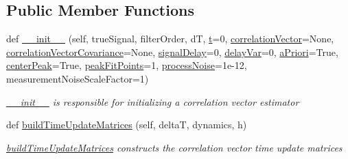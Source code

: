 \subsection*{Public Member Functions}
\begin{DoxyCompactItemize}
\item 
def \hyperlink{classSignalCorrelationSubstate_1_1CorrelationFilter_a98d7aaf451122a2bc10fdcffafcf1768}{\+\_\+\+\_\+init\+\_\+\+\_\+} (self, true\+Signal, filter\+Order, dT, \hyperlink{classSignalCorrelationSubstate_1_1CorrelationFilter_a7931bebb63d9482b44f69d31786c4086}{t}=0, \hyperlink{classSignalCorrelationSubstate_1_1CorrelationFilter_ae308a025a3a7ebdf4e66b5fd3fdf2b7d}{correlation\+Vector}=None, \hyperlink{classSignalCorrelationSubstate_1_1CorrelationFilter_a484e6bdabe405d0aba1dcf4d5729dd72}{correlation\+Vector\+Covariance}=None, \hyperlink{classSignalCorrelationSubstate_1_1CorrelationFilter_a01e35890dee1d79bd0e4f9e82cb16e3f}{signal\+Delay}=0, \hyperlink{classSignalCorrelationSubstate_1_1CorrelationFilter_a34d52beb18c131f2305689d48f612a5a}{delay\+Var}=0, \hyperlink{classSignalCorrelationSubstate_1_1CorrelationFilter_a960e7455c5def570629d69a2bf1cb288}{a\+Priori}=True, \hyperlink{classSignalCorrelationSubstate_1_1CorrelationFilter_a8e53182c2ff431a6a545a265cda6ba48}{center\+Peak}=True, \hyperlink{classSignalCorrelationSubstate_1_1CorrelationFilter_a85a73739e9bb0a7f20886a812a3afa83}{peak\+Fit\+Points}=1, \hyperlink{classSignalCorrelationSubstate_1_1CorrelationFilter_abbd9598dd2d237abb1eef86ba427da7f}{process\+Noise}=1e-\/12, measurement\+Noise\+Scale\+Factor=1)
\begin{DoxyCompactList}\small\item\em \hyperlink{classSignalCorrelationSubstate_1_1CorrelationFilter_a98d7aaf451122a2bc10fdcffafcf1768}{\+\_\+\+\_\+init\+\_\+\+\_\+} is responsible for initializing a correlation vector estimator \end{DoxyCompactList}\item 
def \hyperlink{classSignalCorrelationSubstate_1_1CorrelationFilter_ad05512ccd7d825c60f671f8a66306e28}{build\+Time\+Update\+Matrices} (self, deltaT, dynamics, h)
\begin{DoxyCompactList}\small\item\em \hyperlink{classSignalCorrelationSubstate_1_1CorrelationFilter_ad05512ccd7d825c60f671f8a66306e28}{build\+Time\+Update\+Matrices} constructs the correlation vector time update matrices \end{DoxyCompactList}\end{DoxyCompactItemize}
